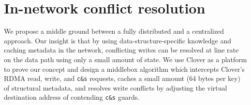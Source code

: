 

\section{In-network conflict resolution}

We propose a middle ground between a fully distributed and a
centralized approach. Our insight is that by using
data-structure-specific knowledge and caching metadata in the network,
conflicting writes can be resolved at line rate on the data path using
only a small amount of state. We use Clover as a platform to prove our
concept and design a middlebox algorithm which intercepts Clover's
RDMA read, write, and \texttt{c\&s} requests, caches a small amount
(64 bytes per key) of structural metadata, and resolves write
conflicts by adjusting the virtual destination address of contending
\texttt{c\&s} guards.




